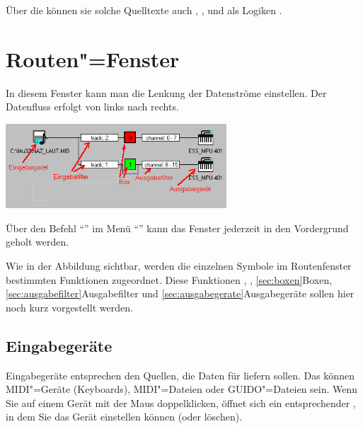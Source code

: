 Über die  können sie solche
Quelltexte auch ,
,
 und als Logiken
.



\section{Routen"=Fenster}\label{sec:DE_ROUTES}
\label{sec:de_routes}

In diesem Fenster kann man die Lenkung der Datenströme einstellen. 
Der Datenfluss erfolgt von links nach rechts.

\begin{center}
\ifhtml
{}
\else
\includegraphics[width=234pt]{Route}
\fi
\end{center}

Über den Befehl "`"' im Menü
"`"' kann das Fenster jederzeit in den
Vordergrund geholt werden.

Wie in der Abbildung sichtbar, werden die einzelnen Symbole im
Routenfenster bestimmten Funktionen zugeordnet. Diese Funktionen
,
, \ref{sec:boxen}{Boxen}, 
\ref{sec:ausgabefilter}{Ausgabefilter} und
\ref{sec:ausgabegerate}{Ausgabegeräte} sollen hier noch kurz
vorgestellt werden.

\subsection{Eingabegeräte}\label{sec:eingabegerate}

Eingabegeräte entsprechen den Quellen, die Daten für \mutabor{} liefern 
sollen. Das können MIDI"=Geräte (Keyboards), MIDI"=Dateien 
oder GUIDO"=Dateien sein. Wenn Sie auf einem Gerät mit der Maus 
doppelklicken, öffnet sich ein entsprechender ,
in dem Sie das Gerät einstellen können (oder löschen).

